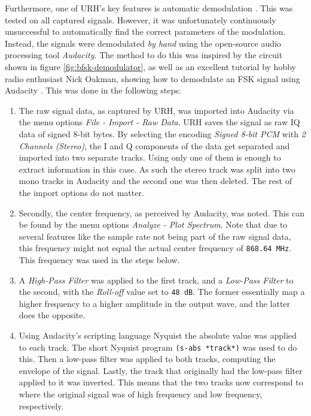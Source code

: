 Furthermore, one of \gls{URH}'s key features is automatic demodulation \cite{urh-paper}. This was tested on all captured signals. However, it was unfortunately continuously unsuccessful to automatically find the correct parameters of the modulation. Instead, the signals were demodulated \textit{by hand} using the open-source audio processing tool \textit{Audacity}. The method to do this was inspired by the circuit shown in figure \ref{fig:bfsk-demodulator}, as well as an excellent tutorial by hobby radio enthusiast Nick Oakman, showing how to demodulate an FSK signal using Audacity \cite{oakman-fsk}. This was done in the following steps:
\begin{enumerate}
    \item The raw signal data, as captured by URH, was imported into Audacity via the menu options \textit{File - Import - Raw Data}. URH saves the signal as raw IQ data of signed 8-bit bytes. By selecting the encoding \textit{Signed 8-bit PCM} with \textit{2 Channels (Stereo)}, the I and Q components of the data get separated and imported into two separate tracks. Using only one of them is enough to extract information in this case. As such the stereo track was split into two mono tracks in Audacity and the second one was then deleted. The rest of the import options do not matter.

    \item Secondly, the center frequency, as perceived by Audacity, was noted. This can be found by the menu options \textit{Analyze - Plot Spectrum}. Note that due to several features like the sample rate not being part of the raw signal data, this frequency might not equal the actual center frequency of \texttt{868.64 MHz}. This frequency was used in the steps below.

    \item A \textit{High-Pass Filter} was applied to the first track, and a \textit{Low-Pass Filter} to the second, with the \textit{Roll-off} value set to \texttt{48 dB}. The former essentially map a higher frequency to a higher amplitude in the output wave, and the latter does the opposite.

    \item Using Audacity's scripting language Nyquist the absolute value was applied to each track. The short Nyquist program \texttt{(s-abs *track*)} was used to do this. Then a low-pass filter was applied to both tracks, computing the envelope of the signal. Lastly, the track that originally had the low-pass filter applied to it was inverted. This means that the two tracks now correspond to where the original signal was of high frequency and low frequency, respectively.


\end{enumerate}
